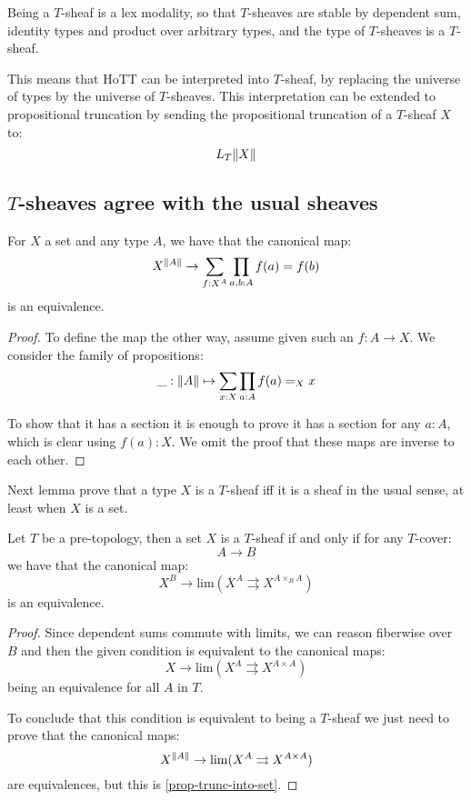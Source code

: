 \begin{remark}
Being a $T$-sheaf is a lex modality, so that $T$-sheaves are stable by dependent sum, identity types and product over arbitrary types, and the type of $T$-sheaves is a $T$-sheaf. 
\end{remark}

This means that HoTT can be interpreted into $T$-sheaf, by replacing the universe of types by the universe of $T$-sheaves. This interpretation can be extended to propositional truncation by sending the propositional truncation of a $T$-sheaf $X$ to:
\[L_T\lVert X \rVert\]

\subsection{$T$-sheaves agree with the usual sheaves}

\begin{lemma}\label{prop-trunc-into-set}
For $X$ a set and any type $A$, we have that the canonical map:
\[X^{\lVert A \rVert} \to \sum_{f:X^A} \prod_{a,b:A} f(a)=f(b)\]
is an equivalence.
\end{lemma}

\begin{proof}
To define the map the other way, assume given such an $f:A\to X$. We consider the family of propositions:
\[ \_:\lVert A \rVert \mapsto \sum_{x:X} \prod_{a:A} f(a)=_X x\]

To show that it has a section it is enough to prove it has a section for any $a:A$, which is clear using $f(a):X$. We omit the proof that these maps are inverse to each other.
\end{proof}

Next lemma prove that a type $X$ is a $T$-sheaf iff it is a sheaf in the usual sense, at least when $X$ is a set.

\begin{lemma}\label{set-sheaves-condition}
Let $T$ be a pre-topology, then a set $X$ is a $T$-sheaf if and only if for any $T$-cover:
\[A\to B\]
we have that the canonical map: 
\[X^B\to \mathrm{lim} (X^A \rightrightarrows X^{A\times_BA})\]
is an equivalence.
\end{lemma}

\begin{proof}
Since dependent sums commute with limits, we can reason fiberwise over $B$ and then the given condition is equivalent to the canonical maps:
\[X\to \mathrm{lim} (X^A \rightrightarrows X^{A\times A})\]
being an equivalence for all $A$ in $T$. 

To conclude that this condition is equivalent to being a $T$-sheaf we just need to prove that the canonical maps:
\[X^{\lVert A \rVert} \to \mathrm{lim} (X^A \rightrightarrows X^{A\times A})\]
are equivalences, but this is \cref{prop-trunc-into-set}.
\end{proof}

